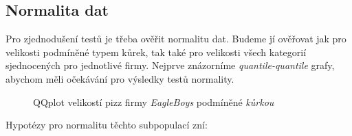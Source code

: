 \documentclass[czech]{article}
\begin{document}
\subsection{Normalita dat}%
\label{sub:normalita_dat}
Pro zjednodušení testů je třeba ověřit normalitu dat. Budeme jí ověřovat jak pro velikosti
podmíněné typem kůrek, tak také pro velikosti všech kategorií sjednocených pro jednotlivé firmy.
Nejprve znázorníme \emph{quantile-quantile} grafy, abychom měli očekávání pro výsledky testů
normality.

\begin{figure}[H]
	\centering
	
	\caption{QQplot velikostí pizz firmy \emph{EagleBoys} podmíněné \emph{kůrkou}}
	\label{fig:qqplots_crusts_eagle}
\end{figure}

Hypotézy pro normalitu těchto subpopulací zní:
\end{document}
